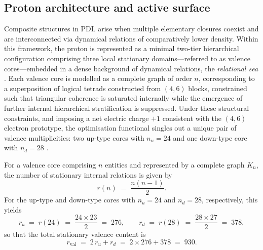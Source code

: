 \documentclass[11pt,a4paper]{article}
\numberwithin{equation}{section}
\begin{document}
\subsection{Proton architecture and active surface}
\label{subsec:proton_architecture}

Composite structures in PDL arise when multiple elementary closures coexist and are interconnected via dynamical relations of comparatively lower density. Within this framework, the proton is represented as a minimal two-tier hierarchical configuration comprising three local stationary domains—referred to as valence cores—embedded in a dense background of dynamical relations, the \emph{relational sea} \cite{LaubscherPDLFull2026,LaubscherLDP2026,LaubscherCombinatorialProton2026}. Each valence core is modelled as a complete graph of order $n$, corresponding to a superposition of logical tetrads constructed from $(4,6)$ blocks, constrained such that triangular coherence is saturated internally while the emergence of further internal hierarchical stratification is suppressed. Under these structural constraints, and imposing a net electric charge $+1$ consistent with the $(4,6)$ electron prototype, the optimisation functional singles out a unique pair of valence multiplicities: two up-type cores with $n_u = 24$ and one down-type core with $n_d = 28$ \cite{LaubscherPDLFull2026,LaubscherLDP2026}.

For a valence core comprising $n$ entities and represented by a complete graph $K_n$, the number of stationary internal relations is given by
\begin{equation}
  r(n) \;=\; \frac{n(n-1)}{2}.
\end{equation}
For the up-type and down-type cores with $n_u = 24$ and $n_d = 28$, respectively, this yields
\begin{equation}
  r_u \;=\; r(24) \;=\; \frac{24\times 23}{2} \;=\; 276,
  \qquad
  r_d \;=\; r(28) \;=\; \frac{28\times 27}{2} \;=\; 378,
\end{equation}
so that the total stationary valence content is
\begin{equation}
  r_{\mathrm{val}} \;=\; 2\,r_u + r_d \;=\; 2\times 276 + 378 \;=\; 930.
\end{equation}
\end{document}
